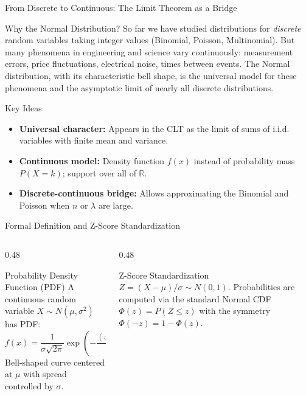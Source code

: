 \documentclass[aspectratio=169,xcolor={dvipsnames,table}]{beamer}
\begin{document}
\begin{frame}{From Discrete to Continuous: The Limit Theorem as a Bridge}
	\vspace{-0.15cm}
	\begin{block}{Why the Normal Distribution?}
		\footnotesize
		So far we have studied distributions for \emph{discrete} random variables taking integer values (Binomial, Poisson, Multinomial). But many phenomena in engineering and science vary continuously: measurement errors, price fluctuations, electrical noise, times between events. The Normal distribution, with its characteristic bell shape, is the universal model for these phenomena and the asymptotic limit of nearly all discrete distributions.
	\end{block}
	\vspace{-0.1cm}
	\pause
	\begin{alertblock}{Key Ideas}
		\footnotesize
		\begin{itemize}\itemsep=0.06cm
			\item \textbf{Universal character:} Appears in the CLT as the limit of sums of i.i.d. variables with finite mean and variance.
			\item \textbf{Continuous model:} Density function $f(x)$ instead of probability mass $P(X=k)$; support over all of $\mathbb{R}$.
			\item \textbf{Discrete-continuous bridge:} Allows approximating the Binomial and Poisson when $n$ or $\lambda$ are large.
		\end{itemize}
	\end{alertblock}
\end{frame}

\begin{frame}{Formal Definition and Z-Score Standardization}
	\vspace{-0.15cm}
	\begin{columns}[T]
		\begin{column}{0.48\textwidth}
			\begin{block}{Probability Density Function (PDF)}
				\footnotesize
				A continuous random variable $X \sim N(\mu, \sigma^{2})$ has PDF:
				$$f(x) = \dfrac{1}{\sigma\sqrt{2\pi}} \exp\left(-\dfrac{(x-\mu)^{2}}{2\sigma^{2}}\right)$$
				Bell-shaped curve centered at $\mu$ with spread controlled by $\sigma$.
			\end{block}
		\end{column}
		\begin{column}{0.48\textwidth}
			\begin{alertblock}{Z-Score Standardization}
				\footnotesize
				$Z = (X - \mu)/\sigma \sim N(0, 1)$. Probabilities are computed via the standard Normal CDF $\Phi(z) = P(Z \le z)$ with the symmetry $\Phi(-z) = 1 - \Phi(z)$.
			\end{alertblock}
		\end{column}
	\end{columns}
\end{frame}
\end{document}
